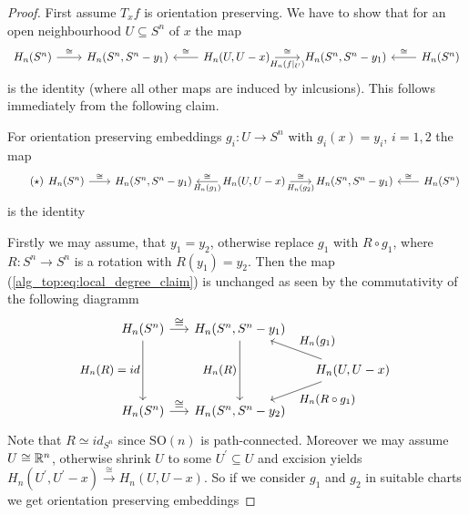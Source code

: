 \begin{proof}
    First assume $T_xf$ is orientation preserving. We have to show that for an open neighbourhood $U \subseteq S^n$ of $x$ the map 
    \[
        \begin{tikzcd}[column sep = 2.2em]
            {H_n(S^n)} & {H_n(S^n,S^n-y_1)} & {H_n(U,U-x)} & {H_n(S^n,S^n-y_1)} & {H_n(S^n)}
            \arrow["\cong", from=1-1, to=1-2]
            \arrow["\cong"', from=1-3, to=1-2]
            \arrow["\cong","H_n(f|_U)"', from=1-3, to=1-4]
            \arrow["\cong"', from=1-5, to=1-4]
        \end{tikzcd}
    \]
    is the identity (where all other maps are induced by inlcusions). This follows immediately from the following claim.

    \begin{claim}
        For orientation preserving embeddings $g_i \colon U \to S^n$ with $g_i(x) = y_i$, $i = 1,2$ the map 
        \begin{equation}
            \label{alg_top:eq:local_degree_claim}
            \tag{$\star$}
            \begin{tikzcd}[column sep = 2em]
                {H_n(S^n)} & {H_n(S^n,S^n-y_1)} & {H_n(U,U-x)} & {H_n(S^n,S^n-y_1)} & {H_n(S^n)}
                \arrow["\cong", from=1-1, to=1-2]
                \arrow["\cong"',"H_n(g_1)", from=1-3, to=1-2]
                \arrow["\cong","H_n(g_2)"', from=1-3, to=1-4]
                \arrow["\cong"', from=1-5, to=1-4]
            \end{tikzcd}
        \end{equation}
        is the identity
    \end{claim}
    Firstly we may assume, that $y_1 = y_2$, otherwise replace $g_1$ with $R \circ g_1$, where $R \colon S^n \to S^n$ is a rotation with $R(y_1) = y_2$. Then the map (\ref{alg_top:eq:local_degree_claim}) is unchanged as seen by the commutativity of the following diagramm
    \[\begin{tikzcd}[every label/.append style={font=\small}, sep =1.5em]
	{H_n(S^n)} & {H_n(S^n,S^n-y_1)} \\
	&& {H_n(U,U-x)} \\
	{H_n(S^n)} & {H_n(S^n,S^n-y_2)}
	\arrow["\cong", from=1-1, to=1-2]
	\arrow["{H_n(R) = id}"', from=1-1, to=3-1]
	\arrow["{H_n(R)}"', from=1-2, to=3-2]
	\arrow["{H_n(g_1)}"', from=2-3, to=1-2]
	\arrow["{H_n(R \circ g_1)}", from=2-3, to=3-2]
	\arrow["\cong", from=3-1, to=3-2]
\end{tikzcd}\]
Note that $R \simeq id_{S^n}$ since $\mathrm{SO}(n)$ is path-connected. Moreover we may assume $U \cong \mathbb{R}^n$, otherwise shrink $U$ to some $U^\prime \subseteq U$ and excision yields $H_n(U^\prime,U^\prime-x) \xrightarrow{\cong}H_n(U,U-x)$. So if we consider $g_1$ and $g_2$ in suitable charts we get orientation preserving embeddings 

\end{proof}
